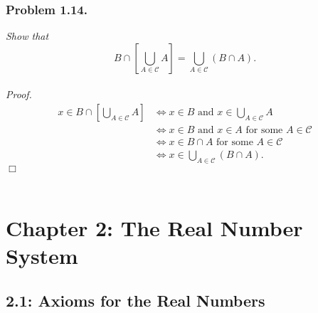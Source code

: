 \documentclass{article}
\begin{document}



\subsubsection*{Problem 1.14.}
\emph{Show that
$$B \cap \left[ \bigcup_{A \in \mathscr{C}} A \right]
= \bigcup_{A \in \mathscr{C}}(B \cap A).$$} \\

\emph{Proof.}
\begin{align*}
x \in B \cap \left[ \bigcup_{A \in \mathscr{C}} A \right]
& \Longleftrightarrow
x \in B \text{ and } x \in \bigcup_{A \in \mathscr{C}} A \\
& \Longleftrightarrow
x \in B \text{ and } x \in A \text{ for some } A \in \mathscr{C} \\
& \Longleftrightarrow
x \in B \cap A \text{ for some } A \in \mathscr{C} \\
& \Longleftrightarrow
x \in \bigcup_{A \in \mathscr{C}}(B \cap A).
\end{align*}
$\Box$ \\\\






\newpage
\section*{Chapter 2: The Real Number System \\}



\subsection*{2.1: Axioms for the Real Numbers \\}
\end{document}
